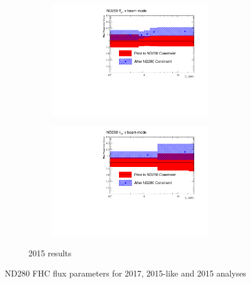 \begin{figure}[h]
\begin{subfigure}[t]{\textwidth}
\begin{subfigure}[t]{0.24\textwidth}
			\includegraphics[width=\textwidth, trim={0mm 0mm 20mm 0mm}, clip]{figures/official/nd_pf_numub_flux_parms_bias_01}
		\end{subfigure}
		\begin{subfigure}[t]{0.24\textwidth}
			\includegraphics[width=\textwidth, trim={0mm 0mm 20mm 0mm}, clip]{figures/official/nd_pf_nueb_flux_parms_bias_01}
		\end{subfigure}
		\caption{2015 results}
	\end{subfigure}
	
	\caption{ND280 FHC flux parameters for 2017, 2015-like and 2015 analyses}
	\label{fig:2015_fluxND280comp_fhc}
\end{figure}


